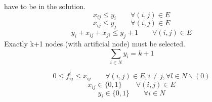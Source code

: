 \documentclass [11pt]{article}
\begin{document}
have to be in the solution.
\begin{equation}
  x_{ij} \leq y_{i} \qquad \forall (i,j) \in E
  \label{lbl:mcfxy1}
\end{equation}
\begin{equation}
  x_{ij} \leq y_{j} \qquad \forall (i,j) \in E
  \label{lbl:mcfxy2}
\end{equation}
\begin{equation}
 y_{i} + x_{ij} + x_{ji} \leq y_{j} + 1 \qquad \forall (i,j) \in E
 \label{lbl:mcfxy3}
\end{equation}
Exactly k+1 nodes (with artificial node) must be selected.
\begin{equation}
  \sum_{i \in N} y_i = k + 1
  \label{lbl:mcfyk}
\end{equation}

\begin{equation}
 0 \leq f_{ij}^{l} \leq x_{ij} \qquad \forall (i,j) \in E, i \neq j, \forall l \in N \backslash (0)
\end{equation}
\begin{equation}
x_{ij} \in \{0,1\} \qquad \forall (i,j) \in E
\end{equation}
\begin{equation}
  y_i \in \{0,1\} \qquad \forall i \in N
\end{equation}
\end{document}
